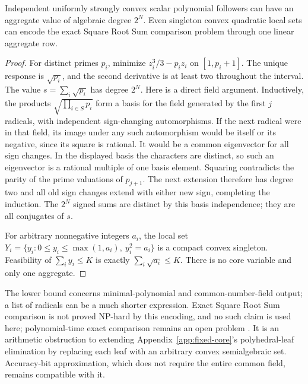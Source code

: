 \begin{proposition}\label{prop:root-sum-degree}
Independent uniformly strongly convex scalar polynomial followers can have an
aggregate value of algebraic degree \(2^N\). Even singleton convex quadratic
local sets can encode the exact Square Root Sum comparison problem through
one linear aggregate row.
\end{proposition}
\begin{proof}
For distinct primes \(p_i\), minimize \(z_i^3/3-p_i z_i\) on \([1,p_i+1]\).
The unique response is \(\sqrt{p_i}\), and the second derivative is at least
two throughout the interval. The value \(s=\sum_i\sqrt{p_i}\) has degree
\(2^N\). Here is a direct field argument. Inductively, the products
\(\sqrt{\prod_{i\in S}p_i}\) form a basis for the field generated by the first
\(j\) radicals, with independent sign-changing automorphisms. If the next
radical were in that field, its image under any such automorphism would be
itself or its negative, since its square is rational. It would be a common
eigenvector for all sign changes. In the displayed basis the characters are
distinct, so such an eigenvector is a rational multiple of one basis element.
Squaring contradicts the parity of the prime valuations of \(p_{j+1}\).
The next extension therefore has degree two and all old sign changes extend
with either new sign, completing the induction. The \(2^N\) signed sums are
distinct by this basis independence; they are all conjugates of \(s\).

For arbitrary nonnegative integers \(a_i\), the local set
\(Y_i=\{y_i:0\le y_i\le\max(1,a_i),\ y_i^2=a_i\}\) is a compact convex
singleton. Feasibility of \(\sum_i y_i\le K\) is exactly
\(\sum_i\sqrt{a_i}\le K\). There is no core variable and only one aggregate.
\end{proof}
The lower bound concerns minimal-polynomial and common-number-field output;
a list of radicals can be a much shorter expression. Exact Square Root Sum
comparison is not proved NP-hard by this encoding, and no such claim is used
here; polynomial-time exact comparison remains an open problem
\citep{EisenbrandEtAl2024}. It is an arithmetic obstruction to extending
Appendix~\ref{app:fixed-core}'s polyhedral-leaf elimination by replacing each
leaf with an arbitrary convex semialgebraic set. Accuracy-bit approximation,
which does not require the entire common field, remains compatible with it.
